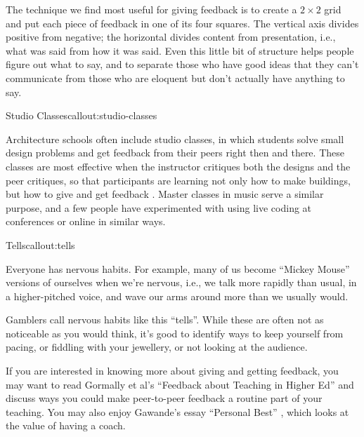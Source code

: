 The technique we find most useful for giving feedback is to create a
$2{\times}2$ grid and put each piece of feedback in one of its four
squares.  The vertical axis divides positive from negative; the
horizontal divides content from presentation, i.e., what was said from
how it was said.  Even this little bit of structure helps people
figure out what to say, and to separate those who have good ideas that
they can't communicate from those who are eloquent but don't actually
have anything to say.

\begin{callout}{Studio Classes}{callout:studio-classes}

Architecture schools often include studio classes, in which students
solve small design problems and get feedback from their peers right
then and there.  These classes are most effective when the instructor
critiques both the designs and the peer critiques, so that
participants are learning not only how to make buildings, but how to
give and get feedback \cite{bib:schon-practitioner}.  Master classes
in music serve a similar purpose, and a few people have experimented
with using live coding at conferences or online in similar ways.

\end{callout}

\begin{callout}{Tells}{callout:tells}

Everyone has nervous habits. For example, many of us become ``Mickey
Mouse'' versions of ourselves when we're nervous, i.e., we talk more
rapidly than usual, in a higher-pitched voice, and wave our arms
around more than we usually would.

Gamblers call nervous habits like this ``tells''.  While these are
often not as noticeable as you would think, it's good to identify ways
to keep yourself from pacing, or fiddling with your jewellery, or not
looking at the audience.

\end{callout}

If you are interested in knowing more about giving and getting
feedback, you may want to read Gormally et al's ``Feedback about
Teaching in Higher Ed'' \cite{bib:gormally-teaching-feedback} and
discuss ways you could make peer-to-peer feedback a routine part of
your teaching.  You may also enjoy Gawande's essay ``Personal Best''
\cite{bib:gawande-personal-best}, which looks at the value of having a
coach.


